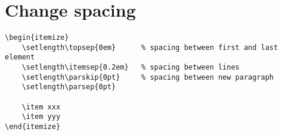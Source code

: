 %
%

\section{Change spacing}

\begin{lstlisting}
\begin{itemize}
    \setlength\topsep{0em}      % spacing between first and last element
    \setlength\itemsep{0.2em}   % spacing between lines
    \setlength\parskip{0pt}     % spacing between new paragraph
    \setlength\parsep{0pt}

    \item xxx
    \item yyy
\end{itemize}
\end{lstlisting}


